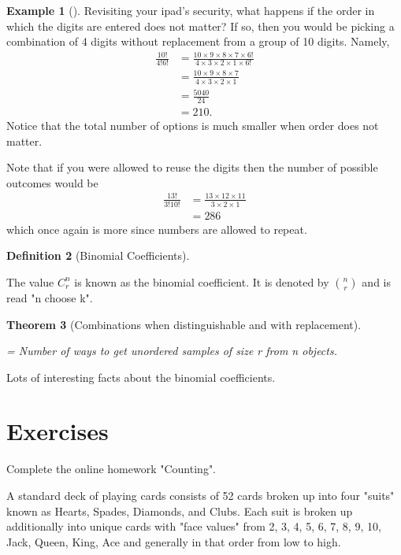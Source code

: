 \documentclass[10pt,]{book}
\theoremstyle{plain}
\newtheorem{theorem}{Theorem}[section]
\theoremstyle{definition}
\newtheorem{definition}[theorem]{Definition}
\theoremstyle{definition}
\newtheorem{example}[theorem]{Example}
\theoremstyle{definition}
\numberwithin{equation}{section}
\begin{document}
\begin{example}[]\label{example-11}
Revisiting your ipad's security, what happens if the order in which the digits are entered does not matter? If so, then you would be picking a combination of 4 digits without replacement from a group of 10 digits. Namely, 
		\begin{align*}
\frac{10!}{4!6!} & = \frac{10 \times 9 \times 8 \times 7 \times 6!}{4 \times 3 \times 2 \times 1 \times 6!}\\
& = \frac{10 \times 9 \times 8 \times 7}{4 \times 3 \times 2 \times 1}\\
& = \frac{5040}{24}\\
& = 210.
\end{align*}
		Notice that the total number of options is much smaller when order does not matter.
\par

		Note that if you were allowed to reuse the digits then the number of possible outcomes would be
		\begin{align*}
\frac{13!}{3!10!} & = \frac{13 \times 12 \times 11}{3 \times 2 \times 1} \\
 & = 286
\end{align*}
		which once again is more since numbers are allowed to repeat.
\end{example}
\begin{definition}[Binomial Coefficients]\label{definition-19}

		The value \(C_r^n\) is known as the binomial coefficient. It is
		denoted by \({n \choose r}\) and is read "n choose k".
\end{definition}
\begin{theorem}[Combinations when distinguishable and with replacement]\label{theorem-16}

	= Number of ways to get unordered samples of size r from n objects. 
	\end{theorem}
\par
Lots of interesting facts about the binomial coefficients.%
\typeout{************************************************}
\typeout{************************************************}
\section[Exercises]{Exercises}\label{section-16}
Complete the online homework "Counting".%
\par

A standard deck of playing cards consists of 52 cards broken up into four "suits" known as Hearts, Spades, Diamonds, and Clubs. Each suit is broken up additionally into unique cards with "face values" from {2, 3, 4, 5, 6, 7, 8, 9, 10, Jack, Queen, King, Ace} and generally in that order from low to high.%
\par
\end{document}
